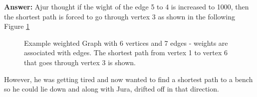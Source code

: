\textbf{Answer:} Ajur thought if the wight of the edge 5 to 4 is increased to 1000, then the shortest path is forced to go through vertex 3 as shown in the following Figure \ref{12qa1}

\begin{figure}
\begin{center}
\caption{ Example weighted Graph with 6 vertices and 7 edges - weights are associated with edges. The shortest path from vertex 1 to vertex 6 that goes through vertex 3 is shown.}\label{12qa1}
\end{center}
\end{figure}

However, he was getting tired and now wanted to find a shortest path to a bench so he could lie down and along with Jura, drifted off in that direction.